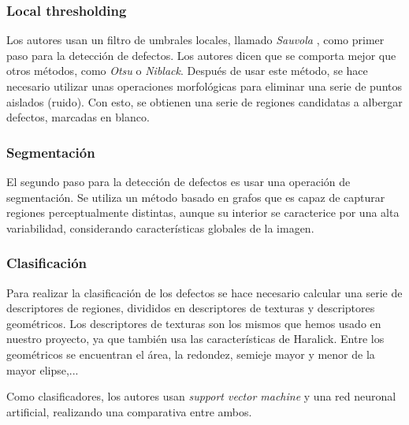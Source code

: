 \subsubsection{Local thresholding}
Los autores usan un filtro de umbrales locales, llamado \emph{Sauvola} \cite{Sauvola00adaptivedocument}, como primer paso para la detección de defectos. Los autores dicen que se comporta mejor que otros métodos, como \textit{Otsu} o \textit{Niblack}. Después de usar este método, se hace necesario utilizar unas operaciones morfológicas para eliminar una serie de puntos aislados (ruido). Con esto, se obtienen una serie de regiones candidatas a albergar defectos, marcadas en blanco.

\subsubsection{Segmentación}
El segundo paso para la detección de defectos es usar una operación de segmentación. Se utiliza un método basado en grafos que es capaz de capturar regiones perceptualmente distintas, aunque su interior se caracterice por una alta variabilidad, considerando características globales de la imagen.

\subsubsection{Clasificación}
Para realizar la clasificación de los defectos se hace necesario calcular una serie de descriptores de regiones, divididos en descriptores de texturas y descriptores geométricos. Los descriptores de texturas son los mismos que hemos usado en nuestro proyecto, ya que también usa las características de Haralick. Entre los geométricos se encuentran el área, la redondez, semieje mayor y menor de la mayor elipse,...

Como clasificadores, los autores usan \emph{support vector machine} y una red neuronal artificial, realizando una comparativa entre ambos.